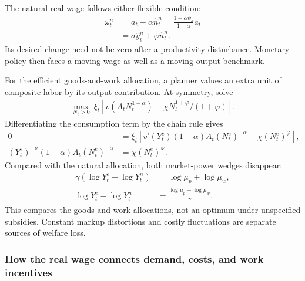 The natural real wage follows either flexible condition:
\begin{align}
 \omega_t^n&=a_t-\alpha\hat n_t^n
            =\frac{1-\alpha\psi_a}{1-\alpha}a_t\\
            &=\sigma\hat y_t^n+\varphi\hat n_t^n.
 \label{eq:sw-natural-real-wage}
\end{align}
Its desired change need not be zero after a productivity disturbance. Monetary
policy then faces a moving wage as well as a moving output benchmark.

For the efficient goods-and-work allocation, a planner values an extra unit of
composite labor by its output contribution. At symmetry, solve
\begin{align}
 \max_{N_t>0}\ \xi_t[v(A_tN_t^{1-\alpha})-\chi N_t^{1+\varphi}/(1+\varphi)].
\end{align}
Differentiating the consumption term by the chain rule gives
\begin{align}
 0&=\xi_t[v'(Y_t^e)(1-\alpha)A_t(N_t^e)^{-\alpha}-\chi(N_t^e)^\varphi],\\
 (Y_t^e)^{-\sigma}(1-\alpha)A_t(N_t^e)^{-\alpha}
 &=\chi(N_t^e)^\varphi.
\end{align}
Compared with the natural allocation, both market-power wedges disappear:
\begin{align}
 \gamma(\log Y_t^e-\log Y_t^n)&=\log\mu_p+\log\mu_w,\\
 \log Y_t^e-\log Y_t^n&=\frac{\log\mu_p+\log\mu_w}{\gamma}.
\end{align}
This compares the goods-and-work allocations, not an optimum under unspecified
subsidies. Constant markup distortions and costly fluctuations are separate
sources of welfare loss.

\subsubsection{How the real wage connects demand, costs, and work incentives}


